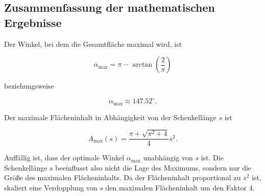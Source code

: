 \subsection{Zusammenfassung der mathematischen Ergebnisse}

Der Winkel, bei dem die Gesamtfläche maximal wird, ist

\[
\boxed{
\alpha_\text{max}
=
\pi
-
\arctan\left(\frac{2}{\pi}\right)
}
\]

beziehungsweise

\[
\boxed{
\alpha_\text{max}
\approx
147.52^\circ.
}
\]

Der maximale Flächeninhalt in Abhängigkeit von der Schenkellänge \(s\) ist

\[
\boxed{
A_\text{max}(s)
=
\frac{\pi+\sqrt{\pi^2+4}}{4}
s^2.
}
\]

Auffällig ist, dass der optimale Winkel \(\alpha_\text{max}\) unabhängig
von \(s\) ist. Die Schenkellänge \(s\) beeinflusst also nicht die Lage des
Maximums, sondern nur die Größe des maximalen Flächeninhalts. Da der
Flächeninhalt proportional zu \(s^2\) ist, skaliert eine Verdopplung von
\(s\) den maximalen Flächeninhalt um den Faktor \(4\).